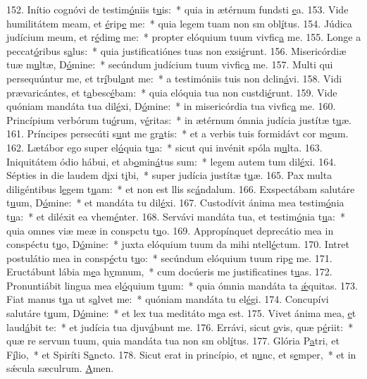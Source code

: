 152. Inítio cognóvi de testim\uline{ó}niis t\uline{u}is:~* quia in ætérnum fundsti \uline{e}a.
153. Vide humilitátem meam, et \uline{é}rip\uline{e} me:~* quia legem tuam non sm obl\uline{í}tus.
154. Júdica judícium meum, et r\uline{é}dim\uline{e} me:~* propter elóquium tuum vivfic\uline{a} me.
155. Longe a peccat\uline{ó}ribus s\uline{a}lus:~* quia justificatiónes tuas non exsi\uline{é}runt.
156. Misericórdiæ tuæ m\uline{u}ltæ, D\uline{ó}mine:~* secúndum judícium tuum vivfic\uline{a} me.
157. Multi qui persequúntur me, et tr\uline{í}bul\uline{a}nt me:~* a testimóniis tuis non dclin\uline{á}vi.
158. Vidi prævaricántes, et t\uline{a}besc\uline{é}bam:~* quia elóquia tua non custdi\uline{é}runt.
159. Vide quóniam mandáta tua dil\uline{é}xi, D\uline{ó}mine:~* in misericórdia tua vivfic\uline{a} me.
160. Princípium verbórum tu\uline{ó}rum, v\uline{é}ritas:~* in ætérnum ómnia judícia justítæ t\uline{u}æ.
161. Príncipes persecúti s\uline{u}nt me gr\uline{a}tis:~* et a verbis tuis formidávt cor m\uline{e}um.
162. Lætábor ego super el\uline{ó}quia t\uline{u}a:~* sicut qui invénit spóla m\uline{u}lta.
163. Iniquitátem ódio hábui, et ab\uline{o}min\uline{á}tus sum:~* legem autem tum dil\uline{é}xi.
164. Sépties in die laudem d\uline{i}xi t\uline{i}bi,~* super judícia justítæ t\uline{u}æ.
165. Pax multa diligéntibus l\uline{e}gem t\uline{u}am:~* et non est llis sc\uline{á}ndalum.
166. Exspectábam salutáre t\uline{u}um, D\uline{ó}mine:~* et mandáta tu dil\uline{é}xi.
167. Custodívit ánima mea testim\uline{ó}nia t\uline{u}a:~* et diléxit ea vhem\uline{é}nter.
168. Servávi mandáta tua, et testim\uline{ó}nia t\uline{u}a:~* quia omnes viæ meæ in conspctu t\uline{u}o.
169. Appropínquet deprecátio mea in conspéctu t\uline{u}o, D\uline{ó}mine:~* juxta elóquium tuum da mihi ntell\uline{é}ctum.
170. Intret postulátio mea in consp\uline{é}ctu t\uline{u}o:~* secúndum elóquium tuum rip\uline{e} me.
171. Eructábunt lábia m\uline{e}a h\uline{y}mnum,~* cum docúeris me justificatines t\uline{u}as.
172. Pronuntiábit lingua mea el\uline{ó}quium t\uline{u}um:~* quia ómnia mandáta ta \uline{ǽ}quitas.
173. Fiat manus t\uline{u}a ut s\uline{a}lvet me:~* quóniam mandáta tu el\uline{é}gi.
174. Concupívi salutáre t\uline{u}um, D\uline{ó}mine:~* et lex tua meditáto m\uline{e}a est.
175. Vivet ánima mea, \uline{e}t laud\uline{á}bit te:~* et judícia tua djuv\uline{á}bunt me.
176. Errávi, sicut \uline{o}vis, quæ p\uline{é}riit:~* quæ re servum tuum, quia mandáta tua non sm obl\uline{í}tus.
177. Glória P\uline{a}tri, et F\uline{í}lio,~* et Spiríti S\uline{a}ncto.
178. Sicut erat in princípio, et n\uline{u}nc, et s\uline{e}mper,~* et in sǽcula sæculrum. \uline{A}men.
